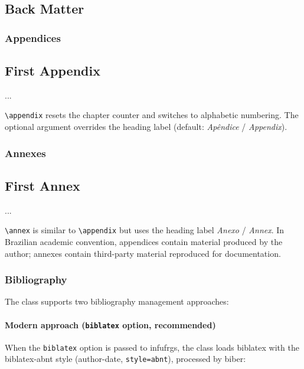 \documentclass[11pt,a4paper]{article}
\newcommand{\pkg}[1]{\textsf{#1}}
\newcommand{\cls}[1]{\textsf{#1}}
\newcommand{\opt}[1]{\texttt{#1}}
\newcommand{\cmd}[1]{\texttt{\textbackslash #1}}
\begin{document}
\section{Back Matter}
\label{sec:backmatter}

\subsection{Appendices}

\begin{latex}
\appendix
\chapter{First Appendix}
...
\end{latex}

\cmd{appendix} resets the chapter counter and switches to alphabetic
numbering.  The optional argument overrides the heading label
(default: \textit{Apêndice} / \textit{Appendix}).

\subsection{Annexes}

\begin{latex}
\annex
\chapter{First Annex}
...
\end{latex}

\cmd{annex} is similar to \cmd{appendix} but uses the heading label
\textit{Anexo} / \textit{Annex}.  In Brazilian academic convention,
appendices contain material produced by the author; annexes contain
third-party material reproduced for documentation.

\subsection{Bibliography}

The class supports two bibliography management approaches:

\subsubsection{Modern approach (\opt{biblatex} option, recommended)}
When the \opt{biblatex} option is passed to \cls{infufrgs}, the class loads \pkg{biblatex} with the \pkg{biblatex-abnt} style (author-date, \opt{style=abnt}), processed by \textsf{biber}:
\end{document}

